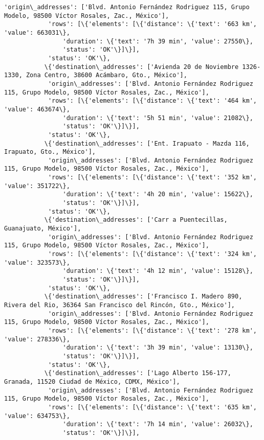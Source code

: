 \documentclass[11pt]{article}
\begin{document}
\begin{Verbatim}[commandchars=\\\{\}]
            'origin\_addresses': ['Blvd. Antonio Fernández Rodriguez 115, Grupo Modelo, 98500 Víctor Rosales, Zac., México'],
            'rows': [\{'elements': [\{'distance': \{'text': '663 km', 'value': 663031\},
                'duration': \{'text': '7h 39 min', 'value': 27550\},
                'status': 'OK'\}]\}],
            'status': 'OK'\},
           \{'destination\_addresses': ['Avienda 20 de Noviembre 1326-1330, Zona Centro, 38600 Acámbaro, Gto., México'],
            'origin\_addresses': ['Blvd. Antonio Fernández Rodriguez 115, Grupo Modelo, 98500 Víctor Rosales, Zac., México'],
            'rows': [\{'elements': [\{'distance': \{'text': '464 km', 'value': 463674\},
                'duration': \{'text': '5h 51 min', 'value': 21082\},
                'status': 'OK'\}]\}],
            'status': 'OK'\},
           \{'destination\_addresses': ['Ent. Irapuato - Mazda 116, Irapuato, Gto., México'],
            'origin\_addresses': ['Blvd. Antonio Fernández Rodriguez 115, Grupo Modelo, 98500 Víctor Rosales, Zac., México'],
            'rows': [\{'elements': [\{'distance': \{'text': '352 km', 'value': 351722\},
                'duration': \{'text': '4h 20 min', 'value': 15622\},
                'status': 'OK'\}]\}],
            'status': 'OK'\},
           \{'destination\_addresses': ['Carr a Puentecillas, Guanajuato, México'],
            'origin\_addresses': ['Blvd. Antonio Fernández Rodriguez 115, Grupo Modelo, 98500 Víctor Rosales, Zac., México'],
            'rows': [\{'elements': [\{'distance': \{'text': '324 km', 'value': 323573\},
                'duration': \{'text': '4h 12 min', 'value': 15128\},
                'status': 'OK'\}]\}],
            'status': 'OK'\},
           \{'destination\_addresses': ['Francisco I. Madero 890, Rivera del Rio, 36364 San Francisco del Rincón, Gto., México'],
            'origin\_addresses': ['Blvd. Antonio Fernández Rodriguez 115, Grupo Modelo, 98500 Víctor Rosales, Zac., México'],
            'rows': [\{'elements': [\{'distance': \{'text': '278 km', 'value': 278336\},
                'duration': \{'text': '3h 39 min', 'value': 13130\},
                'status': 'OK'\}]\}],
            'status': 'OK'\},
           \{'destination\_addresses': ['Lago Alberto 156-177, Granada, 11520 Ciudad de México, CDMX, México'],
            'origin\_addresses': ['Blvd. Antonio Fernández Rodriguez 115, Grupo Modelo, 98500 Víctor Rosales, Zac., México'],
            'rows': [\{'elements': [\{'distance': \{'text': '635 km', 'value': 634753\},
                'duration': \{'text': '7h 14 min', 'value': 26032\},
                'status': 'OK'\}]\}],

\end{Verbatim}
\end{document}
